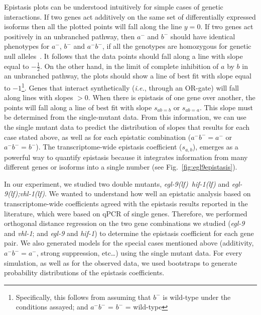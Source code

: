 \documentclass[9pt,twocolumn,twoside,lineno]{pnas-new}
\newcommand{\gene}[1]{\emph{#1}}
\newcommand{\eglvhl}{\emph{\mbox{egl-9(lf);vhl-1(lf)}}}
\newcommand{\eglhif}{\emph{\mbox{egl-9(lf)}~\mbox{hif-1(lf)}}}
\begin{document}
Epistasis plots can be understood intuitively for simple cases of genetic
interactions. If two genes act additively on the same set of differentially
expressed isoforms then all the plotted points will fall along the line $y=0$.
If two genes act positively in an unbranched pathway, then $a^-$ and $b^-$ should
have identical phenotypes for $a^-$, $b^-$ and $a^-b^-$, if all the genotypes are
homozygous for genetic null alleles~\cite{Huang2006}. It follows that the
data points should fall along a line with slope equal to $-\frac{1}{2}$. On the
other hand, in the limit of complete inhibition of $a$ by $b$ in an unbranched
pathway, the plots should show
a line of best fit with slope equal to $-1$\footnote{Specifically, this follows
from assuming that $b^-$ is wild-type under the conditions assayed; and
$a^-b^-$ = $b^-$ = wild-type}.
Genes that interact synthetically (\emph{i.e.}, through an OR-gate) will fall
along lines with slopes $>0$. When there is epistasis of one gene over another,
the points will fall along a line of best fit with slope $s_{ab=b}$ or $s_{ab=a}$.
This slope must be determined from the single-mutant data.
From this information, we can use the single mutant data to predict the
distribution of slopes that results for each case stated above, as well as for
each epistatic combination ($a^-b^-=a^-$ or $a^-b^-=b^-$). The transcriptome-wide
epistasis coefficient ($s_{a, b}$), emerges as a powerful way to quantify
epistasis because it integrates information from many different genes or isoforms
into a single number (see Fig.~\ref{fig:egl9epistasis}).

In our experiment, we studied two double mutants, \eglhif{} and \eglvhl{}.
We wanted to understand how well an epistatic analysis based on transcriptome-wide
coefficients agreed with the epistasis results reported in the literature, which
were based on qPCR of single genes. Therefore, we performed orthogonal distance
regression on the two gene combinations we studied (\gene{egl-9} and
\gene{vhl-1}; and \gene{egl-9} and \gene{hif-1}) to determine the epistasis
coefficient for each gene pair. We also generated models for the special cases
mentioned above (additivity, $a^-b^-=a^-$, strong suppression, etc\ldots) using
the single mutant data. For every simulation, as well as for the observed data,
we used bootstraps to generate probability distributions of the epistasis
coefficients.
\end{document}
